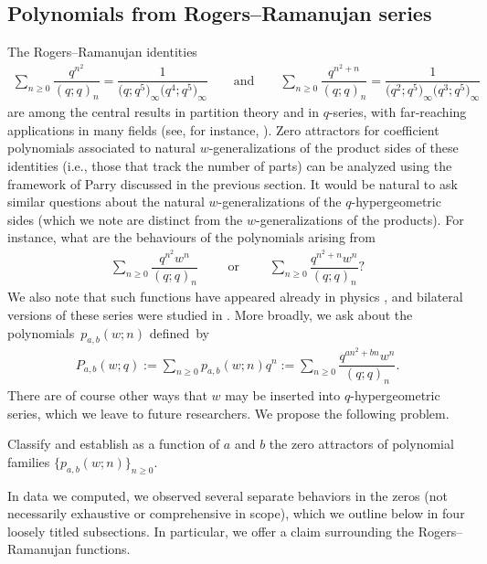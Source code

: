 \documentclass[pdftex]{sigma}
\numberwithin{equation}{section}
\def\lp{\left(}
\def\rp{\right)}
\begin{document}
\subsection{Polynomials from Rogers--Ramanujan series}%

The Rogers--Ramanujan identities
\begin{align*}
 \sum_{n \geq 0} \dfrac{q^{n^2}}{\lp q;q \rp_n} = \dfrac{1}{\big( q; q^5 \big)_\infty \big( q^4; q^5 \big)_\infty} \qquad \text{and} \qquad \sum_{n \geq 0} \dfrac{q^{n^2 + n}}{\lp q; q \rp_n} = \dfrac{1}{\big( q^2; q^5 \big)_\infty \big( q^3; q^5 \big)_\infty}
\end{align*}
are among the central results in partition theory and in $q$-series, with far-reaching applications in many fields (see, for instance, \cite{Sills}). Zero attractors for coefficient polynomials associated to natural $w$-generalizations of the product sides of these identities (i.e., those that track the number of parts) can be analyzed using the framework of Parry discussed in the previous section. It would be natural to ask similar questions about the natural $w$-generalizations of the $q$-hypergeometric sides (which we note are distinct from the $w$-generalizations of the products). For instance, what are the behaviours of the polynomials arising from
\begin{align*}
 \sum_{n \geq 0} \dfrac{q^{n^2} w^n}{\lp q;q \rp_n} \qquad \text{ or } \qquad \sum_{n \geq 0} \dfrac{q^{n^2 + n} w^n}{\lp q;q \rp_n}?
\end{align*}
We also note that such functions have appeared already in physics \cite{Zhu}, and bilateral versions of these series were studied in \cite{Schlosser}. More broadly, we ask about the polynomials~$ p_{a,b}(w;n)$ defined~by
\begin{align*}
 P_{a,b}(w;q):= \sum_{n \geq 0} p_{a,b}(w;n) q^n := \sum_{n \geq 0} \dfrac{q^{an^2 + bn} w^n}{\lp q;q \rp_n}.
\end{align*}
There are of course other ways that $w$ may be inserted into $q$-hypergeometric series, which we leave to future researchers. We propose the following problem.

\begin{Problem}
 Classify and establish as a function of $a$ and $b$ the zero attractors of polynomial families $\{ p_{a,b}(w;n) \}_{n \geq 0}$.
\end{Problem}

In data we computed, we observed several separate behaviors in the zeros (not necessarily exhaustive or comprehensive in scope), which we outline below in four loosely titled subsections. In particular, we offer a claim surrounding the Rogers--Ramanujan functions.
\end{document}
